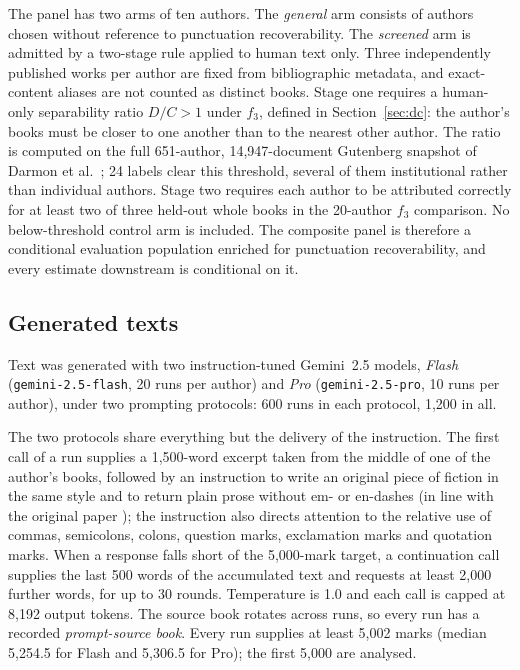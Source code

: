 \documentclass[11pt]{article}
\newcommand{\fThree}{\ensuremath{f_3}\xspace}
\begin{document}
The panel has two arms of ten authors.  The \emph{general} arm consists
of authors chosen without reference to punctuation recoverability.  The
\emph{screened} arm is admitted by a two-stage rule applied to human text
only.  Three independently published works per author are fixed from
bibliographic metadata, and exact-content aliases are not counted as
distinct books.  Stage one requires a human-only separability ratio \(D/C > 1\) under
\fThree, defined in Section~\ref{sec:dc}: the author's books must be closer
to one another than to the nearest other author.  The ratio is computed on
the full 651-author, 14,947-document Gutenberg snapshot of Darmon et al.\
\cite{darmon2021}; 24 labels clear this threshold, several of them
institutional rather than individual authors. Stage
two requires each author to be attributed correctly for at least two of
three held-out whole books in the 20-author \fThree comparison. No below-threshold control arm is
included.  The composite panel is therefore a conditional evaluation
population enriched for punctuation recoverability, and every estimate
downstream is conditional on it.

\subsection{Generated texts}
\label{sec:generated}

Text was generated with two instruction-tuned Gemini~2.5 models,
\emph{Flash} (\texttt{gemini-2.5-flash}, 20 runs per author) and
\emph{Pro} (\texttt{gemini-2.5-pro}, 10 runs per author), under two
prompting protocols: 600 runs in each protocol, 1,200 in all.

The two protocols share everything but the delivery of the instruction.
The first call of a run supplies a 1,500-word excerpt taken from the
middle of one of the author's books, followed by an instruction to write
an original piece of fiction in the same style and to return plain prose
without em- or en-dashes (in line with the original paper
\cite{darmon2021}); the instruction also directs attention to the relative
use of commas, semicolons, colons, question marks, exclamation marks and
quotation marks.  When a response falls short of the 5,000-mark target, a
continuation call supplies the last 500 words of the accumulated text and
requests at least 2,000 further words, for up to 30 rounds.  Temperature
is 1.0 and each call is capped at 8,192 output tokens.  The source book
rotates across runs, so every run has a recorded \emph{prompt-source
book}.  Every run supplies at least 5,002 marks (median 5,254.5 for Flash
and 5,306.5 for Pro); the first 5,000 are analysed.
\end{document}
